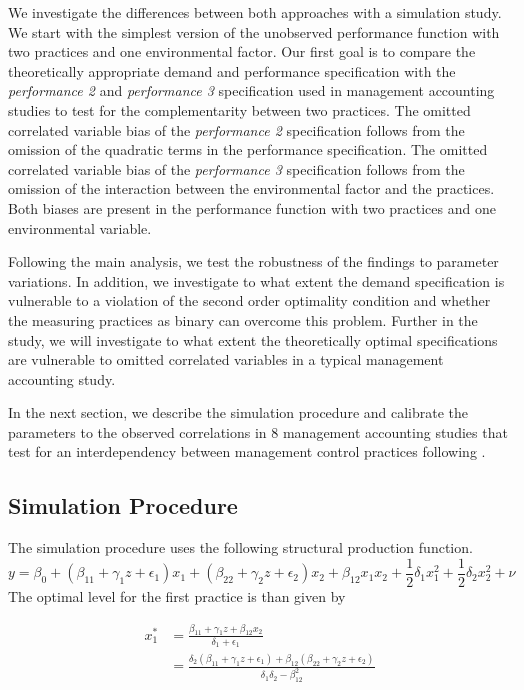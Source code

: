 \documentclass[12pt]{article}
\begin{document}
We investigate the differences between both approaches with a simulation study. We start with the simplest version of the unobserved performance function with two practices and one environmental factor. Our first goal is to compare the theoretically appropriate demand and performance specification with the \emph{performance 2} and \emph{performance 3} specification used in management accounting studies to test for the complementarity between two practices. The omitted correlated variable bias of  the \emph{performance 2} specification follows from the omission of the quadratic terms in the performance specification. The omitted correlated variable bias of the \emph{performance 3} specification follows from the omission of the interaction between the environmental factor and the practices. Both biases are present in the performance function with two practices and one environmental variable. 

Following the main analysis, we test the robustness of the findings to parameter variations. In addition, we investigate to what extent the demand specification is vulnerable to a violation of the second order optimality condition and whether the measuring practices as binary can overcome this problem. Further in the study, we will investigate to what extent the theoretically optimal specifications are vulnerable to omitted correlated variables in a typical management accounting study. 

In the next section, we describe the simulation procedure and calibrate the parameters to the observed correlations in 8 management accounting studies that test for an interdependency between management control practices following \citet{Grabner2013}. 

\subsection{Simulation Procedure}

The simulation procedure uses the following structural production function. 
\begin{equation}\label{eq:structural}
y  = \beta_0 + (\beta_{11} + \gamma_1 z + \epsilon_1) x_1 
						+ (\beta_{22} + \gamma_2 z  + \epsilon_2) x_2 
                        + \beta_{12} x_1 x_2 + \frac{1}{2}\delta_1 x^2_1 + \frac{1}{2}\delta_2 x^2_2 + \nu
\end{equation}
The optimal level for the first practice is than given by 
	
\begin{equation}\label{eq:optimal}
\begin{aligned}
x_1^* &= \frac{\beta_11 + \gamma_1 z + \beta_{12} x_2}{\delta_1 + \epsilon_{1} } \\
		   &= \frac{\delta_2 (\beta_{11} + \gamma_1 z + \epsilon_1) 
           					+ \beta_{12} (\beta_{22} + \gamma_2 z + \epsilon_2) }
                            {\delta_1 \delta_2 - \beta_{12}^2}
\end{aligned}
\end{equation}
\end{document}
